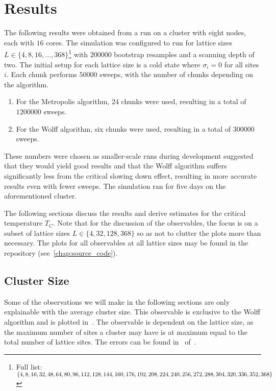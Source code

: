 \chapter{Results}
	The following results were obtained from a run on a cluster with eight nodes, each with $16$ cores. The simulation was configured to run for lattice sizes $L \in \{4, 8, 16, \dots, 368\}$\footnote{Full list: $\{4, 8, 16, 32, 48, 64, 80, 96, 112, 128, 144, 160, 176, 192, 208, 224, 240, 256, 272, 288, 304, 320,\\336, 352, 368\}$} with $\num{200000}$ bootstrap resamples and a scanning depth of two. The initial setup for each lattice size is a cold state where $\sigma_i = 0$ for all sites $i.$ Each chunk performs $\num{50000}$ sweeps, with the number of chunks depending on the algorithm.
	\begin{enumerate}
		\item For the Metropolis algorithm, $\num{24}$ chunks were used, resulting in a total of $\num{1200000}$ sweeps.
		\item For the Wolff algorithm, six chunks were used, resulting in a total of $\num{300000}$ sweeps.
	\end{enumerate}
	These numbers were chosen as smaller-scale runs during development suggested that they would yield good results and that the Wolff algorithm suffers significantly less from the critical slowing down effect, resulting in more accurate results even with fewer sweeps. The simulation ran for five days on the aforementioned cluster.
	
	The following sections discuss the results and derive estimates for the critical temperature $T_C$. Note that for the discussion of the observables, the focus is on a subset of lattice sizes $L \in \{4, 32, 128, 368\}$ so as not to clutter the plots more than necessary. The plots for all observables at all lattice sizes may be found in the repository (see~\cref{chap:source_code}).
	
	\section{Cluster Size}\label{sec:res:cluster_size}
		Some of the observations we will make in the following sections are only explainable with the average cluster size. This observable is exclusive to the Wolff algorithm and is plotted in~. The observable is dependent on the lattice size, as the maximum number of sites a cluster may have is at maximum equal to the total number of lattice sites.
		The errors can be found in~ of~.
		
